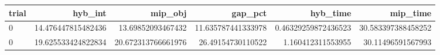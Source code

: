 \begin{tabular}{lrrrrr}
\hline
trial & hyb_int & mip_obj & gap_pct & hyb_time & mip_time \\ \hline
0 & 14.476447815482436 & 13.69852093467432 & 11.635787441333978 & 0.46329259872436523 & 30.583397388458252 \\
0 & 19.625533424822834 & 20.672313766661976 & 26.49154730110522 & 1.160412311553955 & 30.11496591567993 \\
\hline
\end{tabular}
